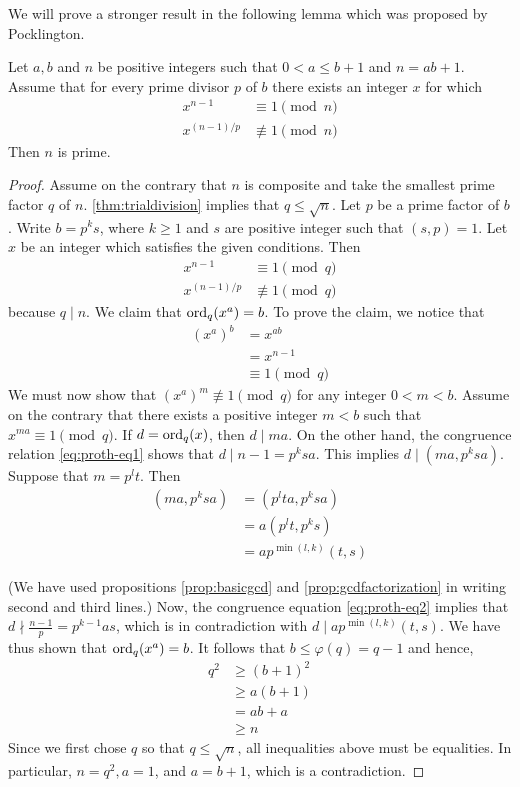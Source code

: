 We will prove a stronger result in the following lemma which was proposed by Pocklington.

	\begin{lemma}
		Let $a, b$ and $n$  be positive integers such that $0<a \leq b+1$ and $n=ab+1$. Assume that for every prime divisor $p$ of $b$ there exists an integer $x$ for which
			\begin{align*}
				x^{n-1} &\equiv 1 \pmod n\\
				x^{(n-1)/p} &\not \equiv 1 \pmod n
			\end{align*}
		Then $n$ is prime.
	\end{lemma}

	\begin{proof}
		Assume on the contrary that $n$ is composite and take the smallest prime factor $q$ of $n$. \autoref{thm:trialdivision} implies that $q \leq \sqrt n$. Let $p$ be a prime factor of $b$. Write $b=p^ks$, where $k\geq 1$ and $s$ are positive integer such that $(s,p)=1$. Let $x$ be an integer which satisfies the given conditions. Then
				\begin{align}
					x^{n-1} &\equiv 1 \pmod q\label{eq:proth-eq1}\\
					x^{(n-1)/p} &\not \equiv 1 \pmod q\label{eq:proth-eq2}
				\end{align}
		because $q\mid n$. We claim that $\operatorname{ord}_q(x^a)=b$. To prove the claim, we notice that
			\begin{align*}
				\left(x^{a}\right)^b &= x^{ab}\\
					&= x^{n-1}\\
					&\equiv 1 \pmod q
			\end{align*}
		We must now show that $\left(x^{a}\right)^m \not \equiv 1 \pmod q$ for any integer $0<m<b$. Assume on the contrary that there exists a positive integer $m<b$ such that $x^{ma} \equiv 1 \pmod q$. If $d=\operatorname{ord}_q(x)$, then $d\mid ma$. On the other hand, the congruence relation \eqref{eq:proth-eq1} shows that $d\mid n-1=p^ksa$. This implies $d\mid (ma, p^ksa)$. Suppose that $m=p^lt$. Then
			\begin{align*}
				\left(ma, p^ksa\right) &= \left(p^lta, p^ksa\right)\\
							&= a \left(p^lt, p^ks\right)\\
							&= a p^{\min(l,k)} (t,s)
			\end{align*}

		(We have used propositions \eqref{prop:basicgcd} and \eqref{prop:gcdfactorization} in writing second and third lines.) Now, the congruence equation \eqref{eq:proth-eq2} implies that $d \nmid \frac{n-1}{p}=p^{k-1}as$, which is in contradiction with $d\mid a p^{\min(l,k)} (t,s)$. We have thus shown that $\operatorname{ord}_q(x^a)=b$. It follows that $b \leq \varphi(q) = q-1$ and hence,
			\begin{align*}
				q^2 &\geq (b+1)^2\\
					&\geq a(b+1)\\
					&=ab+a\\
					&\geq n
			\end{align*}
		Since we first chose $q$ so that $q \leq \sqrt n$, all inequalities above must be equalities. In particular, $n=q^2, a=1$, and $a=b+1$, which is a contradiction.
	\end{proof}


